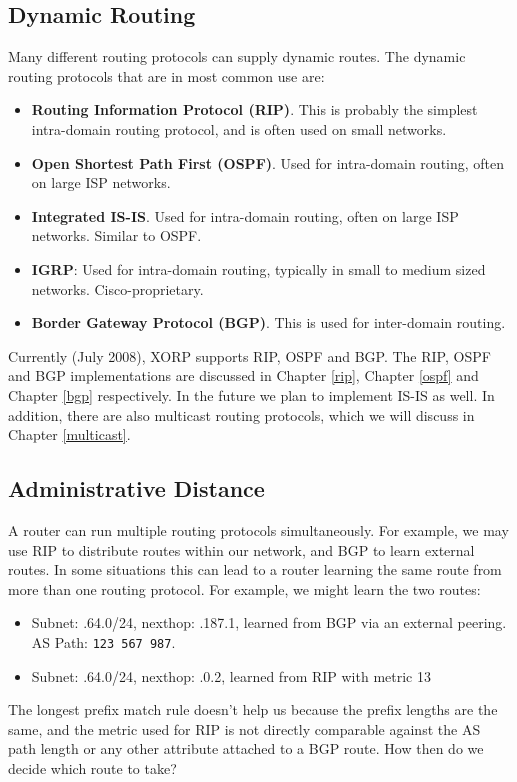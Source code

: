 \subsection{Dynamic Routing}

Many different routing protocols can supply dynamic routes.  The dynamic
routing protocols that are in most common use are:
\begin{itemize}
\item {\bf Routing Information Protocol (RIP)}.  This is probably the
simplest intra-domain routing protocol, and is often used on small
networks.
\item {\bf Open Shortest Path First (OSPF)}.  Used for intra-domain routing,
often on large ISP networks.
\item {\bf Integrated IS-IS}.  Used for intra-domain routing, often
on large ISP networks.  Similar to OSPF.
\item {\bf IGRP}: Used for intra-domain routing, typically in small to
medium sized networks.  Cisco-proprietary.
\item {\bf Border Gateway Protocol (BGP)}.  This is used for
inter-domain routing.
\end{itemize}
Currently (July 2008), XORP supports RIP, OSPF and BGP.
The RIP, OSPF and BGP implementations are discussed in Chapter \ref{rip},
Chapter \ref{ospf} and Chapter \ref{bgp} respectively.
In the future we plan to implement IS-IS as well.
In addition, there are also multicast routing protocols, which we will
discuss in Chapter \ref{multicast}.

\subsection{Administrative Distance}

A router can run multiple routing protocols simultaneously.  For
example, we may use RIP to distribute routes within our network, and
BGP to learn external routes.  In some situations this can lead to a
router learning the same route from more than one routing protocol.
For example, we might learn the two routes:
\begin{itemize}
\item Subnet: {.64.0/24}, nexthop: {.187.1},
learned from BGP via an external peering. AS Path: {\tt 123 567 987}.
\item Subnet: {.64.0/24}, nexthop: {.0.2}, learned
from RIP with metric 13
\end{itemize}
The longest prefix match rule doesn't help us because the prefix
lengths are the same, and the metric used for RIP is not directly
comparable against the AS path length or any other attribute attached
to a BGP route.  How then do we decide which route to take?

